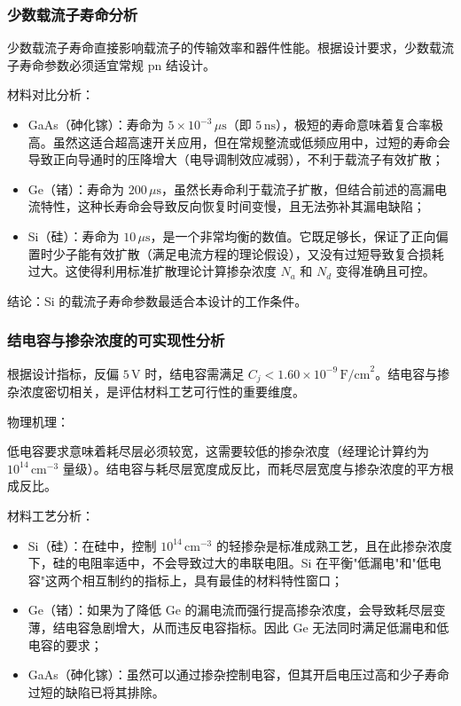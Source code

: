 \documentclass[12pt,a4paper]{article}
\begin{document}
\subsubsection{少数载流子寿命分析}

少数载流子寿命直接影响载流子的传输效率和器件性能。根据设计要求，少数载流子寿命参数必须适宜常规 pn 结设计。

{\heiti 材料对比分析：}

\begin{itemize}[leftmargin=2em]
    \item {\heiti GaAs（砷化镓）}：寿命为 $5 \times 10^{-3}\,\mu\text{s}$（即 $5\,\text{ns}$），极短的寿命意味着复合率极高。虽然这适合超高速开关应用，但在常规整流或低频应用中，过短的寿命会导致正向导通时的压降增大（电导调制效应减弱），不利于载流子有效扩散；
    
    \item {\heiti Ge（锗）}：寿命为 $200\,\mu\text{s}$，虽然长寿命利于载流子扩散，但结合前述的高漏电流特性，这种长寿命会导致反向恢复时间变慢，且无法弥补其漏电缺陷；
    
    \item {\heiti Si（硅）}：寿命为 $10\,\mu\text{s}$，是一个非常均衡的数值。它既足够长，保证了正向偏置时少子能有效扩散（满足电流方程的理论假设），又没有过短导致复合损耗过大。这使得利用标准扩散理论计算掺杂浓度 $N_a$ 和 $N_d$ 变得准确且可控。
\end{itemize}

{\heiti 结论：}Si 的载流子寿命参数最适合本设计的工作条件。

\subsubsection{结电容与掺杂浓度的可实现性分析}

根据设计指标，反偏 $5\,\text{V}$ 时，结电容需满足 $C_j < 1.60 \times 10^{-9}\,\text{F/cm}^2$。结电容与掺杂浓度密切相关，是评估材料工艺可行性的重要维度。

{\heiti 物理机理：}

低电容要求意味着耗尽层必须较宽，这需要较低的掺杂浓度（经理论计算约为 $10^{14}\,\text{cm}^{-3}$ 量级）。结电容与耗尽层宽度成反比，而耗尽层宽度与掺杂浓度的平方根成反比。

{\heiti 材料工艺分析：}

\begin{itemize}[leftmargin=2em]
    \item {\heiti Si（硅）}：在硅中，控制 $10^{14}\,\text{cm}^{-3}$ 的轻掺杂是标准成熟工艺，且在此掺杂浓度下，硅的电阻率适中，不会导致过大的串联电阻。Si 在平衡"低漏电"和"低电容"这两个相互制约的指标上，具有最佳的材料特性窗口；
    
    \item {\heiti Ge（锗）}：如果为了降低 Ge 的漏电流而强行提高掺杂浓度，会导致耗尽层变薄，结电容急剧增大，从而违反电容指标。因此 Ge 无法同时满足低漏电和低电容的要求；
    
    \item {\heiti GaAs（砷化镓）}：虽然可以通过掺杂控制电容，但其开启电压过高和少子寿命过短的缺陷已将其排除。
\end{itemize}
\end{document}
